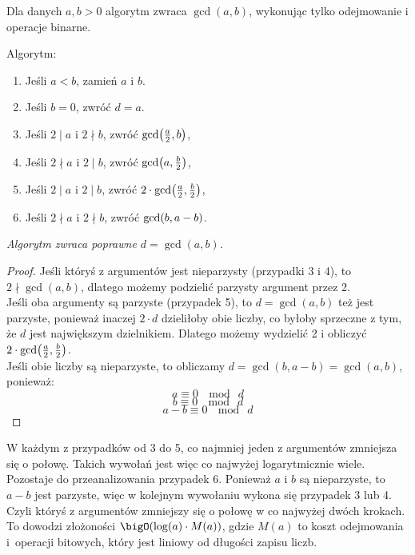 Dla danych \( a,b > 0 \) algorytm zwraca \( \gcd(a,b) \), wykonując tylko odejmowanie i operacje binarne.

\begin{greyframe}
    Algorytm:
    \begin{enumerate}
    \item Jeśli \( a < b \), zamień \( a \) i \( b \).
    \item Jeśli \( b = 0 \), zwróć \( d = a \).
    \item Jeśli \( 2 \mid a \) i \( 2 \nmid b \), zwróć \( \gcd\pars{\frac{a}{2}, b} \),
    \item Jeśli \( 2 \nmid a \) i \( 2 \mid b \), zwróć \( \gcd\pars{a, \frac{b}{2}} \),
    \item Jeśli \( 2 \mid a \) i \( 2 \mid b \), zwróć \( 2 \cdot \gcd\pars{\frac{a}{2}, \frac{b}{2}} \),
    \item Jeśli \( 2 \nmid a \) i \( 2 \nmid b \), zwróć \( \gcd\pars{b, a - b} \).
    \end{enumerate}
\end{greyframe}

\vspace{1em}\noindent
\textit{Algorytm zwraca poprawne \( d = \gcd(a, b) \).}
\begin{proof}
    Jeśli któryś z argumentów jest nieparzysty (przypadki 3 i 4), to \( 2 \nmid \gcd(a, b) \), dlatego możemy podzielić parzysty argument przez 2. \\
    Jeśli oba argumenty są parzyste (przypadek 5), to \( d = \gcd(a, b) \) też jest parzyste, ponieważ inaczej \( 2 \cdot d \) dzieliłoby obie liczby, co byłoby sprzeczne z tym, że \( d \) jest największym dzielnikiem.
    Dlatego możemy wydzielić 2 i obliczyć \( 2 \cdot \gcd\pars{\frac{a}{2}, \frac{b}{2}} \). \\
    Jeśli obie liczby są nieparzyste, to obliczamy \( d = \gcd(b, a - b) = \gcd(a, b) \), ponieważ:
    \[
        a \equiv 0 \ \mod \ d
    \]
    \[
        b \equiv 0 \ \mod \ d
    \]
    \[
        a - b \equiv 0 \ \mod \ d
    \]
\end{proof}

W każdym z przypadków od 3 do 5, co najmniej jeden z argumentów zmniejsza się o połowę. Takich wywołań jest więc co najwyżej logarytmicznie wiele.
Pozostaje do przeanalizowania przypadek 6. Ponieważ \( a \) i \( b \) są nieparzyste, to \( a - b \) jest parzyste, więc w kolejnym wywołaniu wykona się przypadek 3 lub 4. Czyli któryś z argumentów zmniejszy się o połowę w co najwyżej dwóch krokach.
To dowodzi złożoności \( \bigO(\log(a) \cdot M(a)) \), gdzie \( M(a) \) to koszt odejmowania i~operacji bitowych, który jest liniowy od długości zapisu liczb.